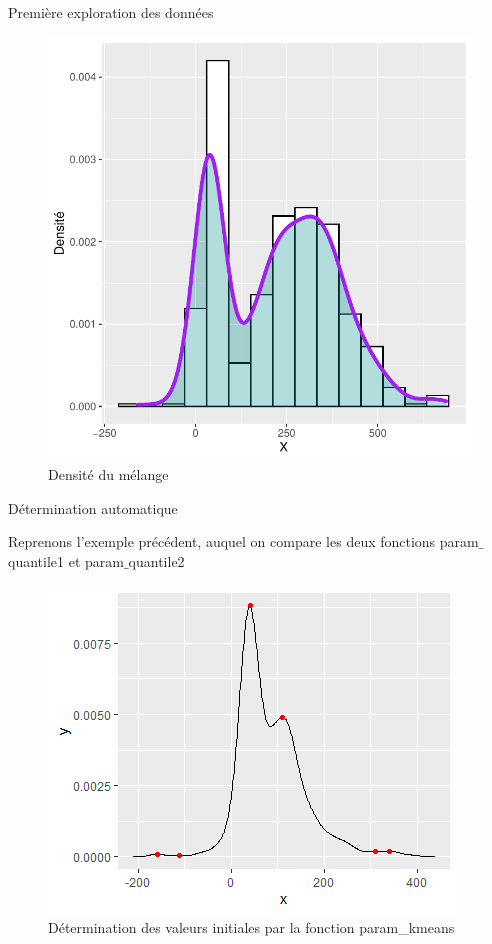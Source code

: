 \documentclass[11pt]{beamer}
\begin{document}
	\begin{frame}{Première exploration des données}
		\begin{figure}[H]
			\centering
			\includegraphics[scale=0.4]{dens1.pdf}
			\caption{Densité du mélange}
		\end{figure}
	\end{frame}

	
	\begin{frame}{Détermination automatique}
	\scriptsize
		\begin{block}{}
			Reprenons l'exemple précédent, auquel on compare les deux fonctions param$\_$quantile1 et param$\_$quantile2
		\end{block}
		\begin{figure}[H]
			\centering
			\includegraphics[scale=0.5]{images/param_kmeans_image.png}
			\caption{Détermination des valeurs initiales par la fonction param\_kmeans}
		\end{figure}
	\end{frame}
\end{document}
